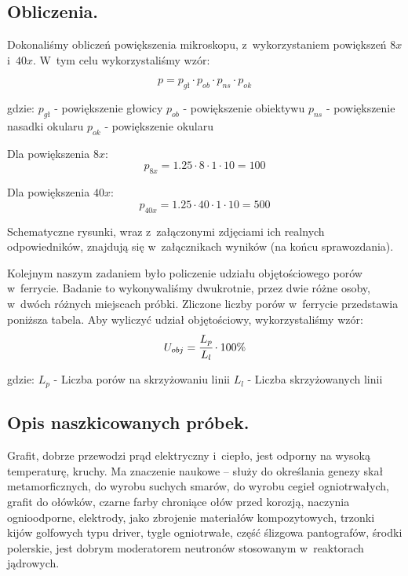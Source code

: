 \subsection{Obliczenia.}

Dokonaliśmy obliczeń powiększenia mikroskopu, z~wykorzystaniem powiększeń $8x$ i~$40x$. W~tym celu wykorzystaliśmy wzór:

$$p=p_{gł}\cdot p_{ob}\cdot p_{ns}\cdot p_{ok}$$

gdzie:
\newline
$p_{gł}$ - powiększenie głowicy
\newline
$p_{ob}$ - powiększenie obiektywu
\newline
$p_{ns}$ - powiększenie nasadki okularu
\newline
$p_{ok}$ - powiększenie okularu
\newline

Dla powiększenia $8x$: 
$$p_{8x}=1.25\cdot 8\cdot 1\cdot 10=100$$

Dla powiększenia $40x$:
$$p_{40x}=1.25\cdot 40\cdot 1\cdot 10=500$$

Schematyczne rysunki, wraz z~załączonymi zdjęciami ich realnych odpowiedników, znajdują się w~załącznikach wyników (na końcu sprawozdania).
\newline

Kolejnym naszym zadaniem było policzenie udziału objętościowego porów w~ferrycie. Badanie to wykonywaliśmy dwukrotnie, przez dwie różne osoby, w~dwóch różnych miejscach próbki. Zliczone liczby porów w~ferrycie przedstawia poniższa tabela. Aby wyliczyć udział objętościowy, wykorzystaliśmy wzór:
$$U_{obj}=\cfrac{L_p}{L_l} \cdot 100\%$$
\newline

gdzie:
\newline
$L_p$ - Liczba porów na skrzyżowaniu linii
\newline
$L_l$ - Liczba skrzyżowanych linii




\subsection{Opis naszkicowanych próbek.}

Grafit, dobrze przewodzi prąd elektryczny i~ciepło, jest odporny na wysoką temperaturę, kruchy. Ma znaczenie naukowe – służy do określania genezy skał metamorficznych, do wyrobu suchych smarów, do wyrobu cegieł ogniotrwałych, grafit do ołówków, czarne farby chroniące ołów przed korozją, naczynia ognioodporne, elektrody, jako zbrojenie materiałów kompozytowych, trzonki kijów golfowych typu driver, tygle ogniotrwałe, część ślizgowa pantografów, środki polerskie, jest dobrym moderatorem neutronów stosowanym w~reaktorach jądrowych.

